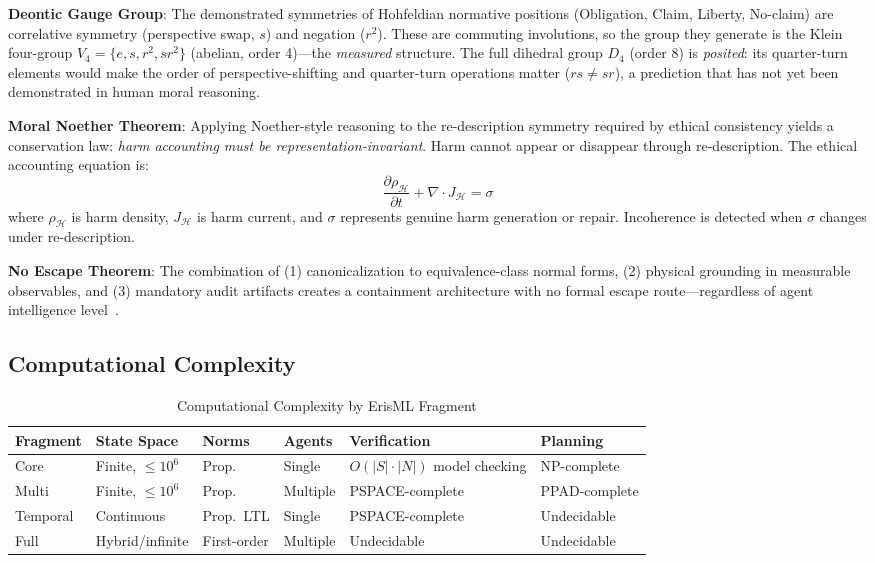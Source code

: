 \documentclass[conference]{IEEEtran}
\begin{document}
\textbf{Deontic Gauge Group}: The demonstrated symmetries of Hohfeldian normative positions (Obligation, Claim, Liberty, No-claim) are correlative symmetry (perspective swap, $s$) and negation ($r^2$). These are commuting involutions, so the group they generate is the Klein four-group $V_4 = \{e, s, r^2, sr^2\}$ (abelian, order 4)---the \emph{measured} structure. The full dihedral group $D_4$ (order 8) is \emph{posited}: its quarter-turn elements would make the order of perspective-shifting and quarter-turn operations matter ($rs \neq sr$), a prediction that has not yet been demonstrated in human moral reasoning.

\textbf{Moral Noether Theorem}: Applying Noether-style reasoning to the re-description symmetry required by ethical consistency yields a conservation law: \emph{harm accounting must be representation-invariant}. Harm cannot appear or disappear through re-description. The ethical accounting equation is:
\begin{equation}
\frac{\partial \rho_\mathcal{H}}{\partial t} + \nabla \cdot J_\mathcal{H} = \sigma
\end{equation}
where $\rho_\mathcal{H}$ is harm density, $J_\mathcal{H}$ is harm current, and $\sigma$ represents genuine harm generation or repair. Incoherence is detected when $\sigma$ changes under re-description.

\textbf{No Escape Theorem}: The combination of (1) canonicalization to equivalence-class normal forms, (2) physical grounding in measurable observables, and (3) mandatory audit artifacts creates a containment architecture with no formal escape route---regardless of agent intelligence level~\cite{bond2026noescape}.

\subsection{Computational Complexity}

\begin{table}[t]
\caption{Computational Complexity by ErisML Fragment}
\label{tab:complexity}
\centering
\footnotesize
\begin{tabular}{@{}p{1.2cm}p{1.3cm}p{0.8cm}p{0.6cm}p{1.5cm}p{1.2cm}@{}}
\toprule
Fragment & State Space & Norms & Agents & Verification & Planning \\
\midrule
Core & Finite, $\leq 10^6$ & Prop. & Single & $O(|S|\cdot|N|)$ model checking & NP-complete \\
Multi & Finite, $\leq 10^6$ & Prop. & Multiple & PSPACE-complete & PPAD-complete \\
Temporal & Continuous & Prop.\ LTL & Single & PSPACE-complete & Undecidable \\
Full & Hybrid/infinite & First-order & Multiple & Undecidable & Undecidable \\
\bottomrule
\end{tabular}
\end{table}
\end{document}
